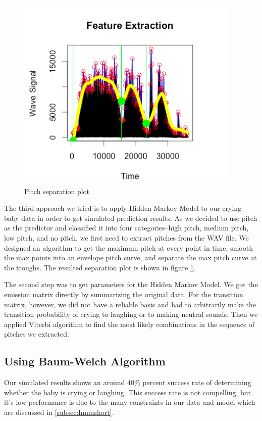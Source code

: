 \documentclass[paper=a4, fontsize=11pt]{scrartcl}
\numberwithin{equation}{section}
\numberwithin{figure}{section}
\numberwithin{table}{section}
\begin{document}
\begin{figure}
\begin{center}
\vspace{-20pt}
\includegraphics[width=.5\textwidth]{plot.png}
\caption{Pitch separation plot}\label{fig:feature}
\vspace{-15pt}
\end{center}
\end{figure}

\vspace{10pt}
The third approach we tried is to apply Hidden Markov Model to our crying baby data in order to get simulated prediction results. As we decided to use pitch as the predictor and classified it into four categories--high pitch, medium pitch, low pitch, and no pitch, we first need to extract pitches from the WAV file. We designed an algorithm to get the maximum pitch at every point in time, smooth the max points into an envelope pitch curve, and separate the max pitch curve at the troughs. The resulted separation plot is shown in figure \ref{fig:feature}.

The second step was to get parameters for the Hidden Markov Model. We got the emission matrix directly by summarizing the original data. For the transition matrix, however, we did not have a reliable basis and had to arbitrarily make the transition probability of crying to laughing or to making neutral sounds. Then we applied Viterbi algorithm to find the most likely combinations in the sequence of pitches we extracted.

\subsection{Using Baum-Welch Algorithm}

Our simulated results shows an around 40\% percent success rate of determining whether the baby is crying or laughing. This success rate is not compelling, but it's low performance is due to the many constraints in our data and model which are discussed in \ref{subsec:hmmshort}.
\end{document}
